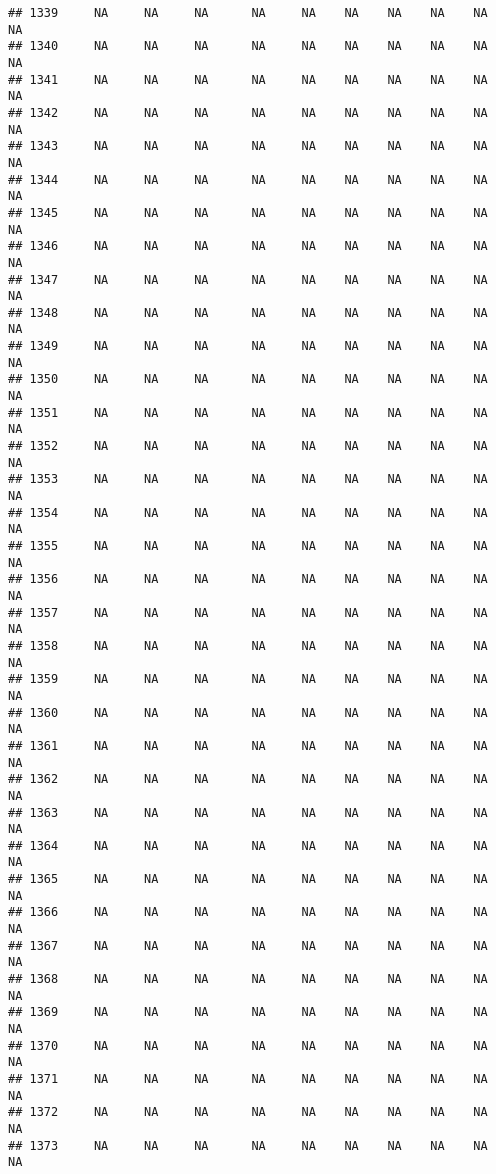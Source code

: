 \documentclass{article}\usepackage{graphicx, color}
\makeatletter
\newenvironment{kframe}{%
 \def\at@end@of@kframe{}%
 \ifinner\ifhmode%
  \def\at@end@of@kframe{\end{minipage}}%
  \begin{minipage}{\columnwidth}%
 \fi\fi%
 \def\FrameCommand##1{\hskip\@totalleftmargin \hskip-\fboxsep
 \colorbox{shadecolor}{##1}\hskip-\fboxsep
     \hskip-\linewidth \hskip-\@totalleftmargin \hskip\columnwidth}%
 \MakeFramed {\advance\hsize-\width
   \@totalleftmargin\z@ \linewidth\hsize
   \@setminipage}}%
 {\par\unskip\endMakeFramed%
 \at@end@of@kframe}
\newenvironment{knitrout}{}{} %
\makeatother
\begin{document}
\begin{knitrout}
\begin{kframe}
\begin{verbatim}
## 1339     NA     NA     NA      NA     NA    NA    NA    NA    NA     NA
## 1340     NA     NA     NA      NA     NA    NA    NA    NA    NA     NA
## 1341     NA     NA     NA      NA     NA    NA    NA    NA    NA     NA
## 1342     NA     NA     NA      NA     NA    NA    NA    NA    NA     NA
## 1343     NA     NA     NA      NA     NA    NA    NA    NA    NA     NA
## 1344     NA     NA     NA      NA     NA    NA    NA    NA    NA     NA
## 1345     NA     NA     NA      NA     NA    NA    NA    NA    NA     NA
## 1346     NA     NA     NA      NA     NA    NA    NA    NA    NA     NA
## 1347     NA     NA     NA      NA     NA    NA    NA    NA    NA     NA
## 1348     NA     NA     NA      NA     NA    NA    NA    NA    NA     NA
## 1349     NA     NA     NA      NA     NA    NA    NA    NA    NA     NA
## 1350     NA     NA     NA      NA     NA    NA    NA    NA    NA     NA
## 1351     NA     NA     NA      NA     NA    NA    NA    NA    NA     NA
## 1352     NA     NA     NA      NA     NA    NA    NA    NA    NA     NA
## 1353     NA     NA     NA      NA     NA    NA    NA    NA    NA     NA
## 1354     NA     NA     NA      NA     NA    NA    NA    NA    NA     NA
## 1355     NA     NA     NA      NA     NA    NA    NA    NA    NA     NA
## 1356     NA     NA     NA      NA     NA    NA    NA    NA    NA     NA
## 1357     NA     NA     NA      NA     NA    NA    NA    NA    NA     NA
## 1358     NA     NA     NA      NA     NA    NA    NA    NA    NA     NA
## 1359     NA     NA     NA      NA     NA    NA    NA    NA    NA     NA
## 1360     NA     NA     NA      NA     NA    NA    NA    NA    NA     NA
## 1361     NA     NA     NA      NA     NA    NA    NA    NA    NA     NA
## 1362     NA     NA     NA      NA     NA    NA    NA    NA    NA     NA
## 1363     NA     NA     NA      NA     NA    NA    NA    NA    NA     NA
## 1364     NA     NA     NA      NA     NA    NA    NA    NA    NA     NA
## 1365     NA     NA     NA      NA     NA    NA    NA    NA    NA     NA
## 1366     NA     NA     NA      NA     NA    NA    NA    NA    NA     NA
## 1367     NA     NA     NA      NA     NA    NA    NA    NA    NA     NA
## 1368     NA     NA     NA      NA     NA    NA    NA    NA    NA     NA
## 1369     NA     NA     NA      NA     NA    NA    NA    NA    NA     NA
## 1370     NA     NA     NA      NA     NA    NA    NA    NA    NA     NA
## 1371     NA     NA     NA      NA     NA    NA    NA    NA    NA     NA
## 1372     NA     NA     NA      NA     NA    NA    NA    NA    NA     NA
## 1373     NA     NA     NA      NA     NA    NA    NA    NA    NA     NA

\end{verbatim}
\end{kframe}
\end{knitrout}
\end{document}
